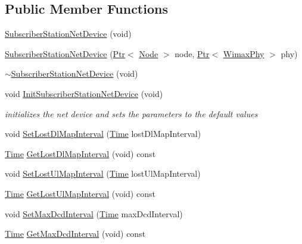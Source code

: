 \subsection*{Public Member Functions}
\begin{DoxyCompactItemize}
\item 
\hyperlink{classns3_1_1SubscriberStationNetDevice_a16b528d44054da6a86ea7ee362cd959c}{Subscriber\+Station\+Net\+Device} (void)
\item 
\hyperlink{classns3_1_1SubscriberStationNetDevice_a3787661c69699ecefe774825ef6f0880}{Subscriber\+Station\+Net\+Device} (\hyperlink{classns3_1_1Ptr}{Ptr}$<$ \hyperlink{classns3_1_1Node}{Node} $>$ node, \hyperlink{classns3_1_1Ptr}{Ptr}$<$ \hyperlink{classns3_1_1WimaxPhy}{Wimax\+Phy} $>$ phy)
\item 
\hyperlink{classns3_1_1SubscriberStationNetDevice_afb2d2b50c39e5a9b0b05f25718e41ad6}{$\sim$\+Subscriber\+Station\+Net\+Device} (void)
\item 
void \hyperlink{classns3_1_1SubscriberStationNetDevice_a4279217c5fd1bb26fb762adbb88e4861}{Init\+Subscriber\+Station\+Net\+Device} (void)
\begin{DoxyCompactList}\small\item\em initializes the net device and sets the parameters to the default values \end{DoxyCompactList}\item 
void \hyperlink{classns3_1_1SubscriberStationNetDevice_ab3e45418a327b441cc4a12b6c2522a08}{Set\+Lost\+Dl\+Map\+Interval} (\hyperlink{classns3_1_1Time}{Time} lost\+Dl\+Map\+Interval)
\item 
\hyperlink{classns3_1_1Time}{Time} \hyperlink{classns3_1_1SubscriberStationNetDevice_a737de9b42898da37948466c9121c1062}{Get\+Lost\+Dl\+Map\+Interval} (void) const 
\item 
void \hyperlink{classns3_1_1SubscriberStationNetDevice_a63f2307780be213f889626b12d7607e3}{Set\+Lost\+Ul\+Map\+Interval} (\hyperlink{classns3_1_1Time}{Time} lost\+Ul\+Map\+Interval)
\item 
\hyperlink{classns3_1_1Time}{Time} \hyperlink{classns3_1_1SubscriberStationNetDevice_a1d99717df71233304f6f1422e4c40140}{Get\+Lost\+Ul\+Map\+Interval} (void) const 
\item 
void \hyperlink{classns3_1_1SubscriberStationNetDevice_a4585da17939328e8b4a1ef4c6834064d}{Set\+Max\+Dcd\+Interval} (\hyperlink{classns3_1_1Time}{Time} max\+Dcd\+Interval)
\item 
\hyperlink{classns3_1_1Time}{Time} \hyperlink{classns3_1_1SubscriberStationNetDevice_a628b51a13458fa7abaef5272abffaeee}{Get\+Max\+Dcd\+Interval} (void) const 

\end{DoxyCompactItemize}
